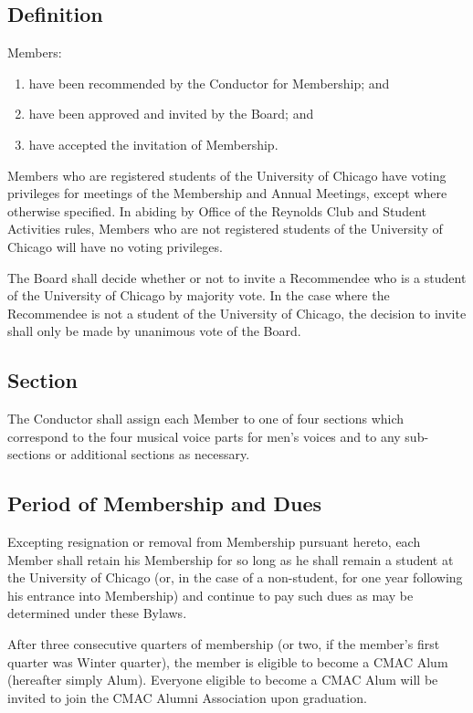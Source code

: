 \documentclass{article}
\begin{document}
\subsection{Definition}

Members:
\begin{enumerate}
  \item have been recommended by the Conductor for Membership; and
  \item have been approved and invited by the Board; and
  \item have accepted the invitation of Membership.
\end{enumerate}
Members who are registered students of the University of Chicago have voting
privileges for meetings of the Membership and Annual Meetings, except where
otherwise specified.  In abiding by Office of the Reynolds Club and Student
Activities rules, Members who are not registered students of the University of
Chicago will have no voting privileges.

The Board shall decide whether or not to invite a Recommendee who is a student
of the University of Chicago by majority vote. In the case where the Recommendee
is not a student of the University of Chicago, the decision to invite shall only
be made by unanimous vote of the Board.

\subsection{Section}

The Conductor shall assign each Member to one of four sections which
correspond to the four musical voice parts for men's voices and to
any sub-sections or additional sections as necessary.

\subsection{Period of Membership and Dues}

Excepting resignation or removal from Membership pursuant hereto,
each Member shall retain his Membership for so long as he shall remain
a student at the University of Chicago (or, in the case of a non-student,
for one year following his entrance into Membership) and continue
to pay such dues as may be determined under these Bylaws.

After three consecutive quarters of membership (or two, if the member's first
quarter was Winter quarter), the member is eligible to become a CMAC Alum
(hereafter simply Alum). Everyone eligible to become a CMAC Alum will be invited
to join the CMAC Alumni Association upon graduation.
\end{document}
